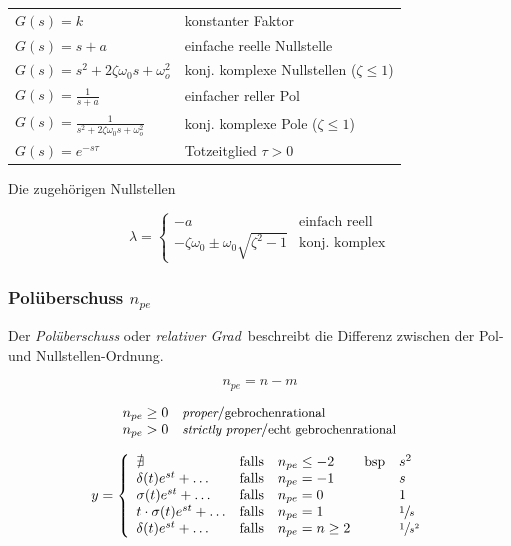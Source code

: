 \documentclass[
  10pt,
  a4paper,
  twocolumn]{article}
\makeatletter
\numberwithin{equation}{section}
\newenvironment{conditions}
  {\par\vspace{\abovedisplayskip}\noindent\begin{tabular}{>{$}l<{$} @{${}:{}$} l}}
  {\end{tabular}\par\vspace{\belowdisplayskip}}
\makeatother
\begin{document}
\begin{conditions}
  G(s)=k                                         & konstanter Faktor \\
  G(s)=s + a                                     & einfache reelle Nullstelle \\
  G(s)=s^2+2\zeta\omega_0 s+\omega_o^2           & konj. komplexe Nullstellen ($\zeta \leq 1$) \\
  G(s)=\frac{1}{s+a}                             & einfacher reller Pol \\
  G(s)=\frac{1}{s^2+2\zeta\omega_0 s+\omega_o^2} & konj. komplexe Pole ($\zeta\leq 1$) \\
  G(s)=e^{-s\tau}                                & Totzeitglied $\tau > 0$ \\
\end{conditions}

Die zugehörigen Nullstellen

\[
\lambda = \left\{ \begin{array}{cl}
-a & \text{einfach reell} \\
-\zeta\omega_0 \pm \omega_0 \sqrt{\zeta^2-1} & \text{konj. komplex}
\end{array}\right.
\]

\hypertarget{poluxfcberschuss-n_pe}{%
\subsubsection{\texorpdfstring{Polüberschuss
\(n_{pe}\)}{Polüberschuss n\_\{pe\}}}\label{poluxfcberschuss-n_pe}}

Der \emph{Polüberschuss} oder \emph{relativer Grad}~beschreibt die
Differenz zwischen der Pol- und Nullstellen-Ordnung.

\[
n_{pe} = n - m
\]

\[
\begin{array}{ll}
n_{pe} \geq 0 & \small{\textit{proper}/\text{gebrochenrational}} \\
n_{pe}  >   0 & \small{\textit{strictly proper}/\text{echt gebrochenrational}} \\
\end{array}
\]

\[
y=\left\{
\begin{array}{lclcl}
\nexists & \text{falls} & n_{pe} \leq -2 & \text{bsp} & s^2 \\
\delta(t)e^{st}+\ldots & \text{falls} & n_{pe} = -1 &  & s \\
\sigma(t)e^{st}+\ldots & \text{falls} & n_{pe} = 0 &  & 1 \\
t\cdot\sigma(t)e^{st}+\ldots & \text{falls} & n_{pe} = 1 &  & \sfrac{1}{s} \\
\delta(t)e^{st}+\ldots & \text{falls} & n_{pe} = n \geq 2 &  &  \sfrac{1}{s^2}
\end{array}
\right.
\]
\end{document}
